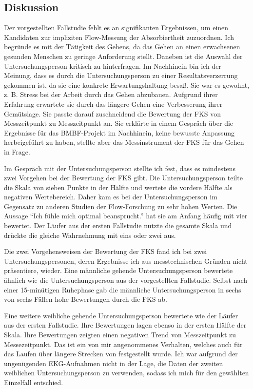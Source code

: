 \subsection{Diskussion}
\label{sub:diskussion_2}
Der vorgestellten Fallstudie fehlt es an signifikanten Ergebnissen, um einen Kandidaten zur impliziten Flow-Messung der Absorbiertheit zuzuordnen. Ich begründe es mit der Tätigkeit des Gehens, da das Gehen an einen erwachsenen gesunden Menschen zu geringe Anforderung stellt. Daneben ist die Auswahl der Untersuchungsperson kritisch zu hinterfragen. Im Nachhinein bin ich der Meinung, dass es durch die Untersuchungsperson zu einer Resultatsverzerrung gekommen ist, da sie eine konkrete Erwartungshaltung besaß. Sie war es gewohnt, z. B. Stress bei der Arbeit durch das Gehen abzubauen. Aufgrund ihrer Erfahrung erwartete sie durch das längere Gehen eine Verbesserung ihrer Gemütslage. Sie passte darauf zuschneidend die Bewertung der \ac{FKS} von Messzeitpunkt zu Messzeitpunkt an. Sie erklärte in einem Gespräch über die Ergebnisse für das \acs{BMBF}-Projekt im Nachhinein, keine bewusste Anpassung herbeigeführt zu haben, stellte aber das Messinstrument der \ac{FKS} für das Gehen in Frage.

Im Gespräch mit der Untersuchungsperson stellte ich fest, dass es mindestens zwei Vorgehen bei der Bewertung der \ac{FKS} gibt. Die Untersuchungsperson teilte die Skala von sieben Punkte in der Hälfte und wertete die vordere Hälfte als negativen Wertebereich. Daher kam es bei der Untersuchungsperson im Gegensatz zu anderen Studien der Flow-Forschung zu sehr hohen Werten. Die Aussage "`Ich fühle mich optimal beansprucht."' hat sie am Anfang häufig mit vier bewertet. Der Läufer aus der ersten Fallstudie nutzte die gesamte Skala und drückte die gleiche Wahrnehmung mit eins oder zwei aus. 

Die zwei Vorgehensweisen der Bewertung der \ac{FKS} fand ich bei zwei Untersuchungspersonen, deren Ergebnisse ich aus messtechnischen Gründen nicht präsentiere, wieder. Eine männliche gehende Untersuchungsperson bewertete ähnlich wie die Untersuchungsperson aus der vorgestellten Fallstudie. Selbst nach einer 15-minütigen Ruhephase gab die männliche Untersuchungsperson in sechs von sechs Fällen hohe Bewertungen durch die \ac{FKS} ab.

Eine weitere weibliche gehende Untersuchungsperson bewertete wie der Läufer aus der ersten Fallstudie. Ihre Bewertungen lagen ebenso in der ersten Hälfte der Skala. Ihre Bewertungen zeigten einen negativen Trend von Messzeitpunkt zu Messezeitpunkt. Das ist ein von mir angenommenes Verhalten, welches auch für das Laufen über längere Strecken von \citet{Schuler2009} festgestellt wurde. Ich war aufgrund der ungenügenden \ac{EKG}-Aufnahmen nicht in der Lage, die Daten der zweiten weiblichen Untersuchungsperson zu verwenden, sodass ich mich für den gewählten Einzelfall entschied.

